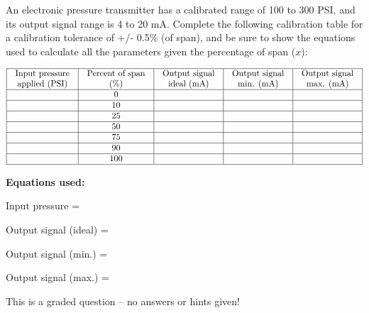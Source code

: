 

An electronic pressure transmitter has a calibrated range of 100 to 300 PSI, and its output signal range is 4 to 20 mA.  Complete the following calibration table for a calibration tolerance of +/- 0.5\% (of span), and be sure to show the equations used to calculate all the parameters given the percentage of span ($x$):


$$\vbox{\offinterlineskip
\halign{\strut
\vrule \quad\hfil # \ \hfil & 
\vrule \quad\hfil # \ \hfil & 
\vrule \quad\hfil # \ \hfil & 
\vrule \quad\hfil # \ \hfil & 
\vrule \quad\hfil # \ \hfil \vrule \cr
\noalign{\hrule}
%
Input pressure & Percent of span & Output signal & Output signal & Output signal \cr
%
applied (PSI) & (\%) & ideal (mA) & min. (mA) & max. (mA) \cr
%
\noalign{\hrule}
%
 & 0 &  &  &  \cr
%
\noalign{\hrule}
%
 & 10 &  &  &  \cr
%
\noalign{\hrule}
%
 & 25 &  &  &  \cr
%
\noalign{\hrule}
%
 & 50 &  &  &  \cr
%
\noalign{\hrule}
%
 & 75 &  &  &  \cr
%
\noalign{\hrule}
%
 & 90 &  &  &  \cr
%
\noalign{\hrule}
%
 & 100 &  &  &  \cr
%
\noalign{\hrule}
} %
}$$ %

\vskip 10pt

\noindent
{\bf Equations used:}

\vskip 20pt

Input pressure = 

\vskip 20pt

Output signal (ideal) = 

\vskip 20pt

Output signal (min.) = 

\vskip 20pt

Output signal (max.) = 

\vfil 

\eject






This is a graded question -- no answers or hints given!

